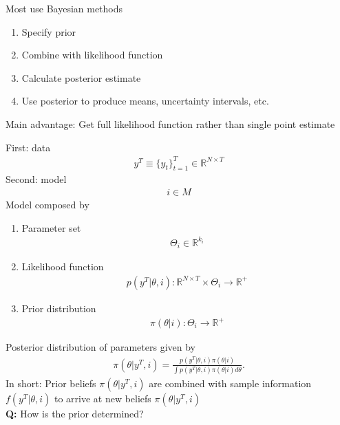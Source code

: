 \documentclass{beamer}
\begin{document}
\begin{frame}
  Most use Bayesian methods
  \begin{enumerate}
    \item Specify prior
    \item Combine with likelihood function
    \item Calculate posterior estimate
    \item Use posterior to produce means, uncertainty intervals, etc. 
  \end{enumerate}
  \medskip
  Main advantage: Get full likelihood function rather than single point estimate
\end{frame}

\begin{frame}
  First: data
  \begin{align}
    y^T \equiv \{y_t \}^T_{t=1} \in \mathbb{R}^{N\times T}
  \end{align}
  Second: model
  \begin{align}
    i \in M
  \end{align}
  Model composed by
  \begin{enumerate}
    \item Parameter set
    \begin{align}
      \Theta_i \in \mathbb{R}^{k_i}
    \end{align}
    \item Likelihood function
    \begin{align}
      p(y^T | \theta,i): \mathbb{R}^{N\times T} \times \Theta_i \rightarrow \mathbb{R}^+
    \end{align}
    \item Prior distribution
    \begin{align}
      \pi(\theta|i): \Theta_i \rightarrow \mathbb{R}^+
    \end{align}
  \end{enumerate}
\end{frame}

\begin{frame}
 Posterior distribution of parameters given by
 \begin{align}
   \pi(\theta|y^T, i) = \frac{p(y^T|\theta,i)\pi(\theta|i)}{\int p(y^T|\theta,i)\pi(\theta|i)d\theta}.
 \end{align}
  In short: Prior beliefs $\pi(\theta|y^T, i)$ are combined with sample information $f(y^T|\theta,i)$ to arrive at new beliefs $\pi(\theta|y^T,i)$
  \\ \medskip
  \textbf{Q:} How is the prior determined?
\end{frame}
\end{document}
